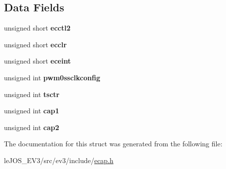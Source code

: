 \subsection*{Data Fields}
\begin{DoxyCompactItemize}
\item 
\hypertarget{structecap_context_aeca0b9d7311d6acea599e568b901257a}{}unsigned short {\bfseries ecctl2}\label{structecap_context_aeca0b9d7311d6acea599e568b901257a}

\item 
\hypertarget{structecap_context_ac9af5c16ab5c8eac1f81503675226953}{}unsigned short {\bfseries ecclr}\label{structecap_context_ac9af5c16ab5c8eac1f81503675226953}

\item 
\hypertarget{structecap_context_a3271d5f86387eade21271043053d6b3b}{}unsigned short {\bfseries eceint}\label{structecap_context_a3271d5f86387eade21271043053d6b3b}

\item 
\hypertarget{structecap_context_a8f3999e3c86541be211c275e4c9a63af}{}unsigned int {\bfseries pwm0ssclkconfig}\label{structecap_context_a8f3999e3c86541be211c275e4c9a63af}

\item 
\hypertarget{structecap_context_a1b7016b57363bb48dfbe56054c9cc5da}{}unsigned int {\bfseries tsctr}\label{structecap_context_a1b7016b57363bb48dfbe56054c9cc5da}

\item 
\hypertarget{structecap_context_a9c282febebcb752e765ad27e89e03fa5}{}unsigned int {\bfseries cap1}\label{structecap_context_a9c282febebcb752e765ad27e89e03fa5}

\item 
\hypertarget{structecap_context_a064b42a8515ae9bbc0510902357f8550}{}unsigned int {\bfseries cap2}\label{structecap_context_a064b42a8515ae9bbc0510902357f8550}

\end{DoxyCompactItemize}


The documentation for this struct was generated from the following file\+:\begin{DoxyCompactItemize}
\item 
le\+J\+O\+S\+\_\+\+E\+V3/src/ev3/include/\hyperlink{ecap_8h}{ecap.\+h}\end{DoxyCompactItemize}
